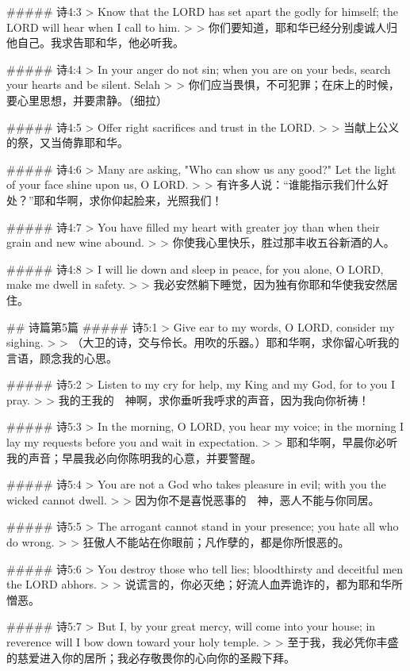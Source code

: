 ##### 诗4:3
> Know that the LORD has set apart the godly for himself; the LORD will hear when I call to him.
>
> 你们要知道，耶和华已经分别虔诚人归他自己。我求告耶和华，他必听我。


##### 诗4:4
> In your anger do not sin; when you are on your beds, search your hearts and be silent. Selah
>
> 你们应当畏惧，不可犯罪；在床上的时候，要心里思想，并要肃静。（细拉）


##### 诗4:5
> Offer right sacrifices and trust in the LORD.
>
> 当献上公义的祭，又当倚靠耶和华。


##### 诗4:6
> Many are asking, "Who can show us any good?" Let the light of your face shine upon us, O LORD.
>
> 有许多人说：“谁能指示我们什么好处？”耶和华啊，求你仰起脸来，光照我们！


##### 诗4:7
> You have filled my heart with greater joy than when their grain and new wine abound.
>
> 你使我心里快乐，胜过那丰收五谷新酒的人。


##### 诗4:8
> I will lie down and sleep in peace, for you alone, O LORD, make me dwell in safety.
>
> 我必安然躺下睡觉，因为独有你耶和华使我安然居住。


## 诗篇第5篇
##### 诗5:1
> Give ear to my words, O LORD, consider my sighing.
>
> （大卫的诗，交与伶长。用吹的乐器。）耶和华啊，求你留心听我的言语，顾念我的心思。


##### 诗5:2
> Listen to my cry for help, my King and my God, for to you I pray.
>
> 我的王我的　神啊，求你垂听我呼求的声音，因为我向你祈祷！


##### 诗5:3
> In the morning, O LORD, you hear my voice; in the morning I lay my requests before you and wait in expectation.
>
> 耶和华啊，早晨你必听我的声音；早晨我必向你陈明我的心意，并要警醒。


##### 诗5:4
> You are not a God who takes pleasure in evil; with you the wicked cannot dwell.
>
> 因为你不是喜悦恶事的　神，恶人不能与你同居。


##### 诗5:5
> The arrogant cannot stand in your presence; you hate all who do wrong.
>
> 狂傲人不能站在你眼前；凡作孽的，都是你所恨恶的。


##### 诗5:6
> You destroy those who tell lies; bloodthirsty and deceitful men the LORD abhors.
>
> 说谎言的，你必灭绝；好流人血弄诡诈的，都为耶和华所憎恶。


##### 诗5:7
> But I, by your great mercy, will come into your house; in reverence will I bow down toward your holy temple.
>
> 至于我，我必凭你丰盛的慈爱进入你的居所；我必存敬畏你的心向你的圣殿下拜。



